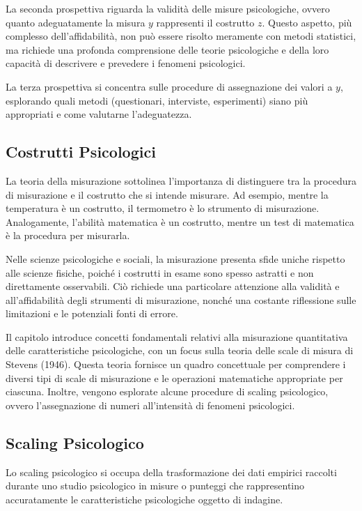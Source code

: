 \documentclass[
  letterpaper,
  DIV=11,
  numbers=noendperiod]{scrreprt}
\theoremstyle{definition}
\theoremstyle{remark}
\begin{document}
La seconda prospettiva riguarda la validità delle misure psicologiche,
ovvero quanto adeguatamente la misura \(y\) rappresenti il costrutto
\(z\). Questo aspetto, più complesso dell'affidabilità, non può essere
risolto meramente con metodi statistici, ma richiede una profonda
comprensione delle teorie psicologiche e della loro capacità di
descrivere e prevedere i fenomeni psicologici.

La terza prospettiva si concentra sulle procedure di assegnazione dei
valori a \(y\), esplorando quali metodi (questionari, interviste,
esperimenti) siano più appropriati e come valutarne l'adeguatezza.

\subsection{Costrutti Psicologici}\label{costrutti-psicologici}

La teoria della misurazione sottolinea l'importanza di distinguere tra
la procedura di misurazione e il costrutto che si intende misurare. Ad
esempio, mentre la temperatura è un costrutto, il termometro è lo
strumento di misurazione. Analogamente, l'abilità matematica è un
costrutto, mentre un test di matematica è la procedura per misurarla.

Nelle scienze psicologiche e sociali, la misurazione presenta sfide
uniche rispetto alle scienze fisiche, poiché i costrutti in esame sono
spesso astratti e non direttamente osservabili. Ciò richiede una
particolare attenzione alla validità e all'affidabilità degli strumenti
di misurazione, nonché una costante riflessione sulle limitazioni e le
potenziali fonti di errore.

Il capitolo introduce concetti fondamentali relativi alla misurazione
quantitativa delle caratteristiche psicologiche, con un focus sulla
teoria delle scale di misura di Stevens (1946). Questa teoria fornisce
un quadro concettuale per comprendere i diversi tipi di scale di
misurazione e le operazioni matematiche appropriate per ciascuna.
Inoltre, vengono esplorate alcune procedure di scaling psicologico,
ovvero l'assegnazione di numeri all'intensità di fenomeni psicologici.

\subsection{Scaling Psicologico}\label{scaling-psicologico}

Lo scaling psicologico si occupa della trasformazione dei dati empirici
raccolti durante uno studio psicologico in misure o punteggi che
rappresentino accuratamente le caratteristiche psicologiche oggetto di
indagine.
\end{document}
